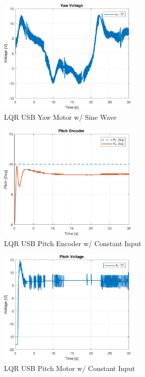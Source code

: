 \documentclass[fontsize=11pt, %
                             paper=letter, %
                             openany, %
                             captions=tableheading,
                             index=totoc,
                             hyperref]{labbook}
\begin{document}
\begin{addmargin}[0cm]{0cm}
\begin{figure}[H]
  \centering
  \includegraphics[width=0.6\textwidth]{figs/matlab/LQR/P_USB/Yaw_Volt_LQR_USB_SIN}
  \caption{LQR USB Yaw Motor w/ Sine Wave}
  \label{fig:Yaw_Volt_LQR_USB_SIN}
\end{figure}

\begin{figure}[H]
  \centering
  \includegraphics[width=0.6\textwidth]{figs/matlab/LQR/P_USB/Pitch_Pos_LQR_USB_CON}
  \caption{LQR USB Pitch Encoder w/ Constant Input}
  \label{fig:Pitch_Pos_LQR_USB_CON}
\end{figure}

\begin{figure}[H]
  \centering
  \includegraphics[width=0.6\textwidth]{figs/matlab/LQR/P_USB/Pitch_Volt_LQR_USB_CON}
  \caption{LQR USB Pitch Motor w/ Constant Input}
  \label{fig:Pitch_Volt_LQR_USB_CON}
\end{figure}


\end{addmargin}
\end{document}
